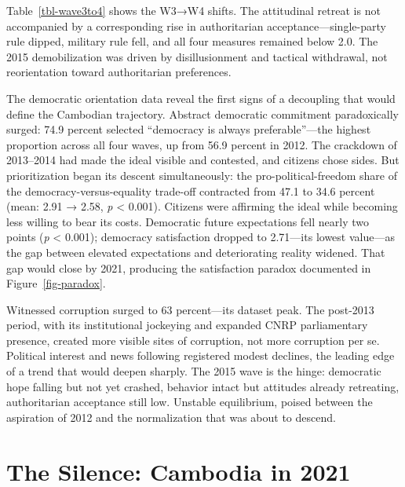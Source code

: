\documentclass[
  12pt,
  letterpaper]{article}
\begin{document}
Table~\ref{tbl-wave3to4} shows the W3→W4 shifts. The attitudinal retreat
is not accompanied by a corresponding rise in authoritarian
acceptance---single-party rule dipped, military rule fell, and all four
measures remained below 2.0. The 2015 demobilization was driven by
disillusionment and tactical withdrawal, not reorientation toward
authoritarian preferences.

The democratic orientation data reveal the first signs of a decoupling
that would define the Cambodian trajectory. Abstract democratic
commitment paradoxically surged: 74.9 percent selected ``democracy is
always preferable''---the highest proportion across all four waves, up
from 56.9 percent in 2012. The crackdown of 2013--2014 had made the
ideal visible and contested, and citizens chose sides. But
prioritization began its descent simultaneously: the
pro-political-freedom share of the democracy-versus-equality trade-off
contracted from 47.1 to 34.6 percent (mean: 2.91 → 2.58, \emph{p}
\textless{} 0.001). Citizens were affirming the ideal while becoming
less willing to bear its costs. Democratic future expectations fell
nearly two points (\emph{p} \textless{} 0.001); democracy satisfaction
dropped to 2.71---its lowest value---as the gap between elevated
expectations and deteriorating reality widened. That gap would close by
2021, producing the satisfaction paradox documented in
Figure~\ref{fig-paradox}.

Witnessed corruption surged to 63 percent---its dataset peak. The
post-2013 period, with its institutional jockeying and expanded CNRP
parliamentary presence, created more visible sites of corruption, not
more corruption per se. Political interest and news following registered
modest declines, the leading edge of a trend that would deepen sharply.
The 2015 wave is the hinge: democratic hope falling but not yet crashed,
behavior intact but attitudes already retreating, authoritarian
acceptance still low. Unstable equilibrium, poised between the
aspiration of 2012 and the normalization that was about to descend.

\section{The Silence: Cambodia in
2021}\label{the-silence-cambodia-in-2021}
\end{document}
